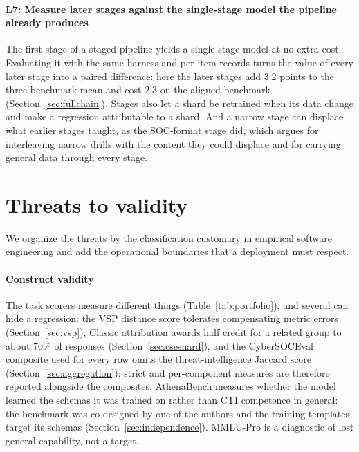 \documentclass[twocolumn]{svjour3}
\begin{document}
\paragraph{L7: Measure later stages against the single-stage model the pipeline already produces}
The first stage of a staged pipeline yields a single-stage model at no extra cost. Evaluating it with the same harness and per-item records turns the value of every later stage into a paired difference: here the later stages add 3.2 points to the three-benchmark mean and cost 2.3 on the aligned benchmark (Section~\ref{sec:fullchain}). Stages also let a shard be retrained when its data change and make a regression attributable to a shard. And a narrow stage can displace what earlier stages taught, as the SOC-format stage did, which argues for interleaving narrow drills with the content they could displace and for carrying general data through every stage.

\section{Threats to validity}\label{sec:limits}
We organize the threats by the classification customary in empirical software engineering \cite{wohlin2012experimentation} and add the operational boundaries that a deployment must respect.

\paragraph{Construct validity}
The task scorers measure different things (Table~\ref{tab:portfolio}), and several can hide a regression: the VSP distance score tolerates compensating metric errors (Section~\ref{sec:vsp}), Classic attribution awards half credit for a related group to about 70\% of responses (Section~\ref{sec:cseshard}), and the CyberSOCEval composite used for every row omits the threat-intelligence Jaccard score (Section~\ref{sec:aggregation}); strict and per-component measures are therefore reported alongside the composites. AthenaBench measures whether the model learned the schemas it was trained on rather than CTI competence in general: the benchmark was co-designed by one of the authors and the training templates target its schemas (Section~\ref{sec:independence}). MMLU-Pro is a diagnostic of lost general capability, not a target.
\end{document}

